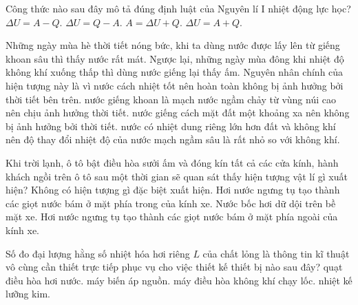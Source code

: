 \begin{ex}%
	Công thức nào sau đây mô tả đúng định luật của Nguyên lí I nhiệt động lực học?
	\choice
	{$\Delta U=A-Q$.}
	{$\Delta U=Q-A$.}
	{$A=\Delta U+Q$.}
	{\True $\Delta U=A+Q$.}
\end{ex}

\begin{ex}%
	Những ngày mùa hè thời tiết nóng bức, khi ta dùng nước được lấy lên từ giếng khoan sâu thì thấy nước rất mát. Ngược lại, những ngày mùa đông khi nhiệt độ không khí xuống thấp thì dùng nước giếng lại thấy ấm. Nguyên nhân chính của hiện tượng này là vì
	\choice
	{nước cách nhiệt tốt nên hoàn toàn không bị ảnh hưởng bởi thời tiết bên trên.}
	{nước giếng khoan là mạch nước ngầm chảy từ vùng núi cao nên chịu ảnh hưởng thời tiết.}
	{nước giếng cách mặt đất một khoảng xa nên không bị ảnh hưởng bởi thời tiết.}
	{\True nước có nhiệt dung riêng lớn hơn đất và không khí nên độ thay đổi nhiệt độ của nước mạch ngầm sâu là rất nhỏ so với không khí.}
\end{ex}

\begin{ex}%
	Khi trời lạnh, ô tô bật điều hòa sưởi ấm và đóng kín tất cả các cửa kính, hành khách ngồi trên ô tô sau một thời gian sẽ quan sát thấy hiện tượng vật lí gì xuất hiện?
	\choice
	{Không có hiện tượng gì đặc biệt xuất hiện.}
	{\True Hơi nước ngưng tụ tạo thành các giọt nước bám ở mặt phía trong của kính xe.}
	{Nước bốc hơi dữ dội trên bề mặt xe.}
	{Hơi nước ngưng tụ tạo thành các giọt nước bám ở mặt phía ngoài của kính xe.}
\end{ex}

\begin{ex}%
	Số đo đại lượng hằng số nhiệt hóa hơi riêng $L$ của chất lỏng là thông tin kĩ thuật vô cùng cần thiết trực tiếp phục vụ cho việc thiết kế thiết bị nào sau đây?
	\choice
	{\True quạt điều hòa hơi nước.}
	{máy biến áp nguồn.}
	{máy điều hòa không khí chạy lốc.}
	{nhiệt kế lưỡng kim.}
\end{ex}

